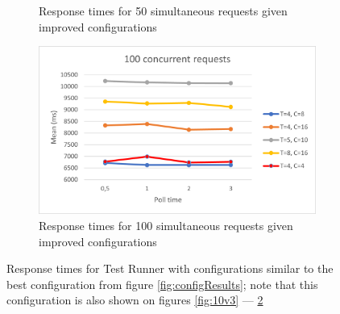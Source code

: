 \begin{figure}[H]
\begin{subfigure}[b]{0.45\textwidth}
        \caption{Response times for 50 simultaneous requests given improved configurations}
        \label{fig:50v3}
    \end{subfigure}
    \hfill
    \begin{subfigure}[b]{0.45\textwidth}
      \centering
      \includegraphics[width=\textwidth]{images/100v3.png}
      \caption{Response times for 100 simultaneous requests given improved configurations}
      \label{fig:100v3}
    \end{subfigure}
  \caption{Response times for Test Runner with configurations similar to the best configuration from figure \ref{fig:configResults}; note that this configuration is also shown on figures \ref{fig:10v3} --- \ref{fig:100v3}}
  \label{fig:improvedConfig}
\end{figure}